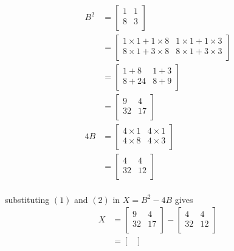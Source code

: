 \documentclass{article}
\begin{document}
\begin{align}
   B^2 & = \begin{bmatrix}
   1 & 1\\
   8 & 3\\
\end{bmatrix}
\nonumber\\
          & = \begin{bmatrix}
   1 \times 1 + 1 \times 8 & 1 \times 1 + 1 \times 3\\
   8 \times 1 + 3 \times 8 & 8 \times 1 + 3 \times 3\\
 \end{bmatrix}
 \nonumber\\
          & = \begin{bmatrix}
    1 + 8 & 1 + 3\\
    8 + 24 & 8 + 9\\
   \end{bmatrix}
   \nonumber\\
          & = \begin{bmatrix}
    9 & 4\\
    32 & 17\\
    \end{bmatrix}\\
4B & = \begin{bmatrix}
   4 \times 1 & 4 \times 1\\
   4 \times 8 & 4 \times 3\\
        \end{bmatrix}
        \nonumber\\
        & = \begin{bmatrix}
    4 & 4\\
    32 & 12\\
    \end{bmatrix}
    \end{align}\\  substituting $(1)$ and $(2)$ in $X = B^2 - 4B$ gives\begin{align}
    X & = \begin{bmatrix}
    9 & 4\\
    32 & 17\\
    \end{bmatrix}-\begin{bmatrix}
    4 & 4\\
    32 & 12\\
    \end{bmatrix}\nonumber\\
    & = \begin{bmatrix}

\end{bmatrix}
\end{align}
\end{document}
